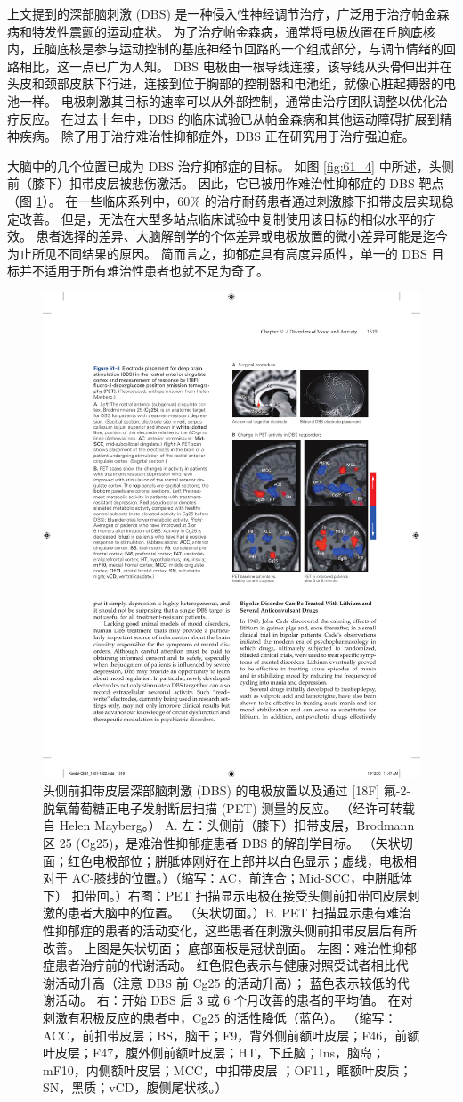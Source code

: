 上文提到的深部脑刺激 (DBS) 是一种侵入性神经调节治疗，广泛用于治疗帕金森病和特发性震颤的运动症状。
为了治疗帕金森病，通常将电极放置在丘脑底核内，丘脑底核是参与运动控制的基底神经节回路的一个组成部分，与调节情绪的回路相比，这一点已广为人知。
DBS 电极由一根导线连接，该导线从头骨伸出并在头皮和颈部皮肤下行进，连接到位于胸部的控制器和电池组，就像心脏起搏器的电池一样。
电极刺激其目标的速率可以从外部控制，通常由治疗团队调整以优化治疗反应。
在过去十年中，DBS 的临床试验已从帕金森病和其他运动障碍扩展到精神疾病。
除了用于治疗难治性抑郁症外，DBS 正在研究用于治疗强迫症。


大脑中的几个位置已成为 DBS 治疗抑郁症的目标。
如图 \ref{fig:61_4} 中所述，头侧前（膝下）扣带皮层被悲伤激活。
因此，它已被用作难治性抑郁症的 DBS 靶点（图 \ref{fig:61_8}）。
在一些临床系列中，60\% 的治疗耐药患者通过刺激膝下扣带皮层实现稳定改善。
但是，无法在大型多站点临床试验中复制使用该目标的相似水平的疗效。
患者选择的差异、大脑解剖学的个体差异或电极放置的微小差异可能是迄今为止所见不同结果的原因。
简而言之，抑郁症具有高度异质性，单一的 DBS 目标并不适用于所有难治性患者也就不足为奇了。


\begin{figure}[htbp]
	\centering
	\includegraphics[width=0.6\linewidth]{chap61/fig_61_8}
	\caption{头侧前扣带皮层深部脑刺激 (DBS) 的电极放置以及通过 [18F] 氟-2-脱氧葡萄糖正电子发射断层扫描 (PET) 测量的反应。 （经许可转载自 Helen Mayberg。） A. 左：头侧前（膝下）扣带皮层，Brodmann 区 25 (Cg25)，是难治性抑郁症患者 DBS 的解剖学目标。 （矢状切面；红色电极部位；胼胝体刚好在上部并以白色显示；虚线，电极相对于 AC-膝线的位置。）（缩写：AC，前连合；Mid-SCC，中胼胝体下） 扣带回。）右图：PET 扫描显示电极在接受头侧前扣带回皮层刺激的患者大脑中的位置。 （矢状切面。）B. PET 扫描显示患有难治性抑郁症的患者的活动变化，这些患者在刺激头侧前扣带皮层后有所改善。 上图是矢状切面； 底部面板是冠状剖面。 左图：难治性抑郁症患者治疗前的代谢活动。 红色假色表示与健康对照受试者相比代谢活动升高（注意 DBS 前 Cg25 的活动升高）； 蓝色表示较低的代谢活动。 右：开始 DBS 后 3 或 6 个月改善的患者的平均值。 在对刺激有积极反应的患者中，Cg25 的活性降低（蓝色）。 （缩写：ACC，前扣带皮层；BS，脑干；F9，背外侧前额叶皮层；F46，前额叶皮层；F47，腹外侧前额叶皮层；HT，下丘脑；Ins，脑岛；mF10，内侧额叶皮层；MCC，中扣带皮层 ；OF11，眶额叶皮质；SN，黑质；vCD，腹侧尾状核。）}
	\label{fig:61_8}
\end{figure}


